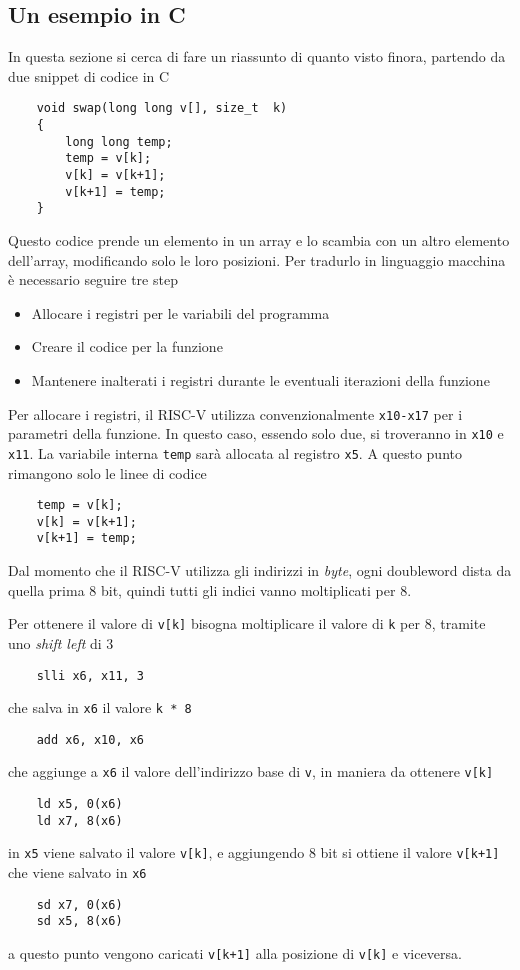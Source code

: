 \documentclass[a4paper,12pt]{article}
\theoremstyle{break}
\newcommand{\code}[1]{\texttt{#1}}
\numberwithin{equation}{section}
\begin{document}
\subsection{Un esempio in C}
In questa sezione si cerca di fare un riassunto di quanto visto finora, partendo da due snippet di codice in C
\begin{verbatim}
    void swap(long long v[], size_t  k)
    {
        long long temp;
        temp = v[k];
        v[k] = v[k+1];
        v[k+1] = temp;
    }
\end{verbatim}
Questo codice prende un elemento in un array e lo scambia con un altro elemento dell'array, modificando solo le loro posizioni. Per tradurlo in linguaggio macchina è necessario seguire tre step
\begin{itemize}
    \item Allocare i registri per le variabili del programma
    \item Creare il codice per la funzione 
    \item Mantenere inalterati i registri durante le eventuali iterazioni della funzione
\end{itemize}
Per allocare i registri, il RISC-V utilizza convenzionalmente \code{x10-x17} per i parametri della funzione. In questo caso, essendo solo due, si troveranno in \code{x10} e \code{x11}. La variabile interna \code{temp} sarà allocata al registro \code{x5}.  
A questo punto rimangono solo le linee di codice
\begin{verbatim}
    temp = v[k];
    v[k] = v[k+1];
    v[k+1] = temp;
\end{verbatim}
Dal momento che il RISC-V utilizza gli indirizzi in \textit{byte}, ogni doubleword dista da quella prima \(8\) bit, quindi tutti gli indici vanno moltiplicati per \(8\).  

Per ottenere il valore di \code{v[k]} bisogna moltiplicare il valore di \code{k} per \(8\), tramite uno \textit{shift left} di 3
\begin{verbatim}
    slli x6, x11, 3    
\end{verbatim}
che salva in \code{x6} il valore \code{k * 8}
\begin{verbatim}
    add x6, x10, x6
\end{verbatim}
che aggiunge a \code{x6} il valore dell'indirizzo base di \code{v}, in maniera da ottenere \code{v[k]}
\begin{verbatim}
    ld x5, 0(x6)
    ld x7, 8(x6)
\end{verbatim}
in \code{x5} viene salvato il valore \code{v[k]}, e aggiungendo \(8\) bit si ottiene il valore \code{v[k+1]} che viene salvato in \code{x6}
\begin{verbatim}
    sd x7, 0(x6)
    sd x5, 8(x6)
\end{verbatim}
a questo punto vengono caricati \code{v[k+1]} alla posizione di \code{v[k]} e viceversa.  
\end{document}
